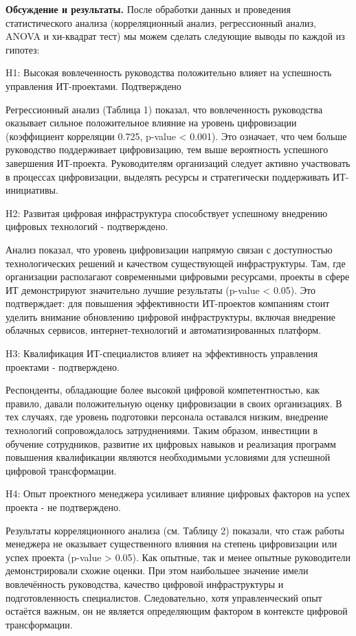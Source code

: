 \begin{multicols}{2}
{\bfseries Обсуждение и результаты.} После обработки данных и проведения
статистического анализа (корреляционный анализ, регрессионный анализ,
ANOVA и хи-квадрат тест) мы можем сделать следующие выводы по каждой из
гипотез:

H1: Высокая вовлеченность руководства положительно влияет на успешность
управления ИТ-проектами. Подтверждено

Регрессионный анализ (Таблица 1) показал, что вовлеченность руководства
оказывает сильное положительное влияние на уровень цифровизации
(коэффициент корреляции 0.725, p-value \textless{} 0.001). Это означает,
что чем больше руководство поддерживает цифровизацию, тем выше
вероятность успешного завершения ИТ-проекта. Руководителям организаций
следует активно участвовать в процессах цифровизации, выделять ресурсы и
стратегически поддерживать ИТ-инициативы.

H2: Развитая цифровая инфраструктура способствует успешному внедрению
цифровых технологий - подтверждено.

Анализ показал, что уровень цифровизации напрямую связан с доступностью
технологических решений и качеством существующей инфраструктуры. Там,
где организации располагают современными цифровыми ресурсами, проекты в
сфере ИТ демонстрируют значительно лучшие результаты (p-value
\textless{} 0.05). Это подтверждает: для повышения эффективности
ИТ-проектов компаниям стоит уделить внимание обновлению цифровой
инфраструктуры, включая внедрение облачных сервисов, интернет-технологий
и автоматизированных платформ.

H3: Квалификация ИТ-специалистов влияет на эффективность управления
проектами - подтверждено.

Респонденты, обладающие более высокой цифровой компетентностью, как
правило, давали положительную оценку цифровизации в своих организациях.
В тех случаях, где уровень подготовки персонала оставался низким,
внедрение технологий сопровождалось затруднениями. Таким образом,
инвестиции в обучение сотрудников, развитие их цифровых навыков и
реализация программ повышения квалификации являются необходимыми
условиями для успешной цифровой трансформации.

H4: Опыт проектного менеджера усиливает влияние цифровых факторов на
успех проекта - не подтверждено.

Результаты корреляционного анализа (см. Таблицу 2) показали, что стаж
работы менеджера не оказывает существенного влияния на степень
цифровизации или успех проекта (p-value \textgreater{} 0.05). Как
опытные, так и менее опытные руководители демонстрировали схожие оценки.
При этом наибольшее значение имели вовлечённость руководства, качество
цифровой инфраструктуры и подготовленность специалистов. Следовательно,
хотя управленческий опыт остаётся важным, он не является определяющим
фактором в контексте цифровой трансформации.
\end{multicols}

